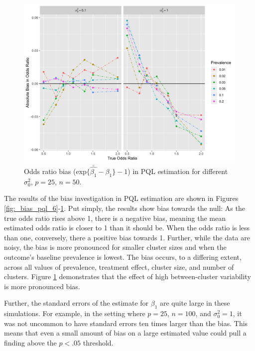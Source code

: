 \documentclass{article}
\begin{document}
\begin{flushleft}
\begin{figure}[]
\begin{center}
\includegraphics[width=\textwidth]{_bias_pql_sbs_p25_n50.png}
  \caption{Odds ratio bias ($\text{exp} \{ \bar{\hat{\beta_1}} - \beta_1 \}-1$) in PQL estimation for different $\sigma^2_0$, $p=25$, $n=50$.}
    \label{fig:_bias_pql_sbs_single_comparison}
\end{center}
\end{figure}

The results of the bias investigation in PQL estimation are shown in Figures \ref{fig:_bias_pql_6}-\ref{fig:_bias_pql_sbs_single_comparison}. Put simply, the results show bias towards the null: As the true odds ratio rises above 1, there is a negative bias, meaning the mean estimated odds ratio is closer to 1 than it should be. When the odds ratio is less than one, conversely, there a positive bias towards 1. Further, while the data are noisy, the bias is more pronounced for smaller cluster sizes and when the outcome's baseline prevalence is lowest. The bias occurs, to a differing extent, across all values of prevalence, treatment effect, cluster size, and number of clusters. Figure \ref{fig:_bias_pql_sbs_single_comparison} demonstrates that the effect of high between-cluster variability is more pronounced bias.

Further, the standard errors of the estimate for $\beta_1$ are quite large in these simulations. For example, in the setting where $p=25$, $n=100$, and $\sigma_0^2=1$, it was not uncommon to have standard errors ten times larger than the bias. This means that even a small amount of bias on a large estimated value could pull a finding above the $p<.05$ threshold.


\end{flushleft}
\end{document}

